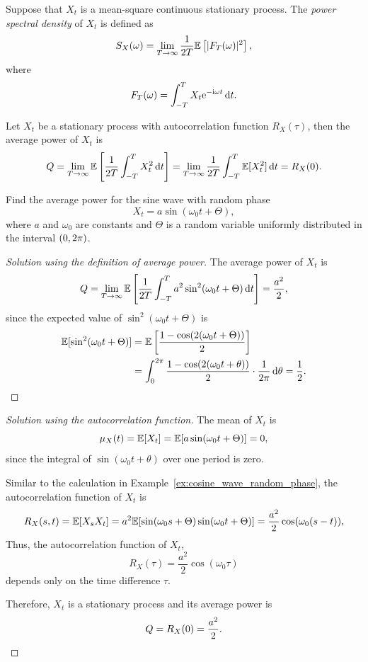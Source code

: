 \begin{definition}
  Suppose that \(X_t\) is a mean-square continuous stationary process. The \emph{power spectral density} of \(X_t\) is defined as
  \[
    S_X(\omega) = \lim_{T \to \infty} \frac{1}{2T} \mathbb{E}\left[|F_T(\omega)|^2\right],
  \]
  where
  \[
    F_T(\omega) = \int_{-T}^T X_t \mathrm{e}^{-\mathrm{i} \omega t} \, \mathrm{d} t.
  \]
\end{definition}

\begin{proposition}
  Let \(X_t\) be a stationary process with autocorrelation function \(R_X(\tau)\), then the average power of \(X_t\) is
  \[
    Q = \lim_{T \to \infty} \mathbb{E}\left[\frac{1}{2T} \int_{-T}^T X_t^2 \, \mathrm{d} t\right] = \lim_{T \to \infty} \frac{1}{2T} \int_{-T}^T \mathbb{E}[X_t^2] \, \mathrm{d} t = R_X(0).
  \]
\end{proposition}

\begin{example}
  Find the average power for the sine wave with random phase
  \[
    X_t = a \sin(\omega_0 t + \Theta),
  \]
  where \(a\) and \(\omega_0\) are constants and \(\Theta\) is a random variable uniformly distributed in the interval \((0, 2\mathrm{\pi})\).
\end{example}
\begin{proof}[Solution using the definition of average power]
  The average power of \(X_t\) is
  \[
    Q = \lim_{T \to \infty} \mathbb{E}\left[\frac{1}{2T} \int_{-T}^T a^2 \sin^2(\omega_0 t + \Theta) \, \mathrm{d} t\right] = \frac{a^2}{2},
  \]
  since the expected value of \(\sin^2(\omega_0 t + \Theta)\) is
  \begin{align*}
    \mathbb{E}[\sin^2(\omega_0 t + \Theta)] &= \mathbb{E}\left[\frac{1 - \cos(2(\omega_0 t + \Theta))}{2}\right] \\
    &= \int_0^{2\mathrm{\pi}} \frac{1 - \cos(2(\omega_0 t + \theta))}{2} \cdot \frac{1}{2\mathrm{\pi}} \, \mathrm{d}\theta = \frac{1}{2}. \qedhere
  \end{align*}
\end{proof}
\begin{proof}[Solution using the autocorrelation function]
  The mean of \(X_t\) is
  \[
    \mu_X(t) = \mathbb{E}[X_t] = \mathbb{E}[a \sin(\omega_0 t + \Theta)] = 0,
  \]
  since the integral of \(\sin(\omega_0 t + \theta)\) over one period is zero.

  Similar to the calculation in Example~\ref{ex:cosine_wave_random_phase}, the autocorrelation function of \(X_t\) is
  \[
    R_X(s, t) = \mathbb{E}[X_s X_t] = a^2 \mathbb{E}[\sin(\omega_0 s + \Theta) \sin(\omega_0 t + \Theta)] = \frac{a^2}{2} \cos(\omega_0 (s - t)),
  \]
  Thus, the autocorrelation function of \(X_t\),
  \[
    R_X(\tau) = \frac{a^2}{2} \cos(\omega_0 \tau)
  \]
  depends only on the time difference \(\tau\).

  Therefore, \(X_t\) is a stationary process and its average power is
  \[
    Q = R_X(0) = \frac{a^2}{2}. \qedhere
  \]
\end{proof}

